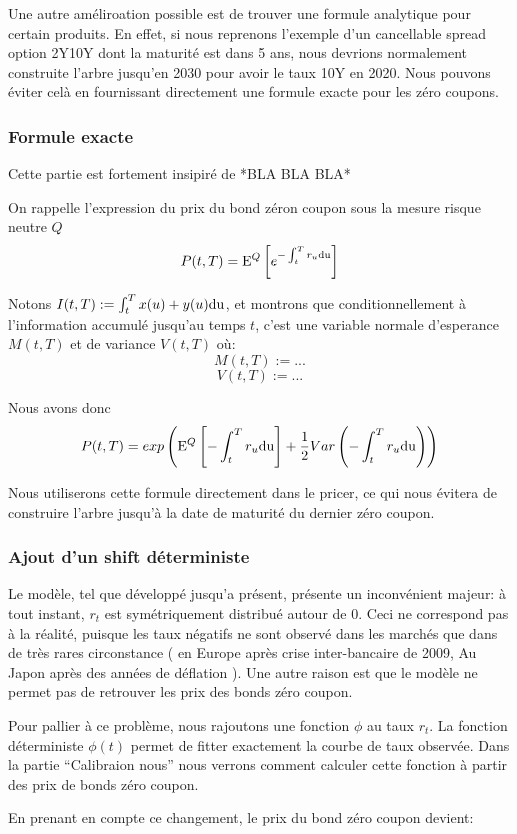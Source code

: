 \documentclass[paper=a4, fontsize=11pt]{scrartcl}
\numberwithin{equation}{section}		%
\numberwithin{figure}{section}			%
\numberwithin{table}{section}				%
\newcommand{\espr}[1]{
  \mathrm{E}^Q \left[ #1 \right]
}
\theoremstyle{definition}
\begin{document}
Une autre améliroation possible est de trouver une formule analytique pour certain produits. En effet, si nous reprenons l'exemple d'un cancellable spread option 2Y10Y dont la maturité est dans 5 ans, nous devrions normalement construite l'arbre jusqu'en 2030 pour avoir le taux 10Y en 2020. Nous pouvons éviter celà en fournissant directement une formule exacte pour les zéro coupons.

\subsubsection{Formule exacte}
Cette partie est fortement insipiré de *BLA BLA BLA*

On rappelle l'expression du prix du bond zéron coupon sous la mesure risque neutre $Q$
$$P(t, T) = \espr{ e^{-\int_t^T r_u \rm{d}u}} $$

Notons $I(t, T) := \int_t^T x(u) + y(u) \rm{d}u$, et montrons que conditionnellement à l'information accumulé jusqu'au temps $t$, c'est une variable normale d'esperance $M(t, T)$ et de variance $V(t, T)$ où:
$$M(t, T) := ...$$
$$V(t, T) := ...$$

Nous avons donc
$$P(t, T) = exp  \left( \espr{ -\int_t^T r_u \rm{d}u} + \frac{1}{2} Var \left( {-\int_t^T r_u \rm{d}u} \right)  \right) $$

Nous utiliserons cette formule directement dans le pricer, ce qui nous évitera de construire l'arbre jusqu'à la date de maturité du dernier zéro coupon.

\subsubsection{Ajout d'un shift déterministe}
Le modèle, tel que développé jusqu'a présent, présente un inconvénient majeur: à tout instant, $r_t$ est symétriquement distribué autour de $0$. Ceci ne correspond pas à la réalité, puisque les taux négatifs ne sont observé dans les marchés que dans de très rares circonstance ( en Europe après crise inter-bancaire de 2009, Au Japon après des années de déflation ). Une autre raison est que le modèle ne permet pas de retrouver les prix des bonds zéro coupon.

Pour pallier à ce problème, nous rajoutons une fonction $\phi$ au taux $r_t$. La fonction déterministe $\phi(t)$ permet de fitter exactement la courbe de taux observée. Dans la partie ``Calibraion nous'' nous verrons comment calculer cette fonction à partir des prix de bonds zéro coupon.

En prenant en compte ce changement, le prix du bond zéro coupon devient:
\end{document}
